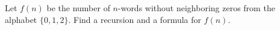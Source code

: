 Let $f(n)$ be the number of $n$-words without neighboring zeros from the alphabet $\{0, 1, 2\}$. Find a recursion and a formula for $f(n)$.
